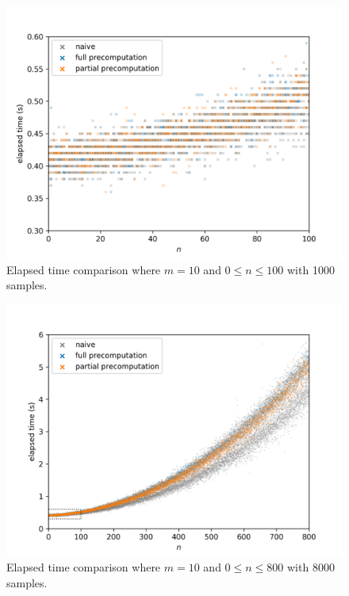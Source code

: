 \newpage

\begin{figure}[H]
	\centering
	\includegraphics[scale=0.7]{figures/precomputation_cpu_small}
	\caption{Elapsed time comparison where $m=10$ and $0\leq n\leq 100$ with 1000 samples.}
\end{figure}

\begin{figure}[H]
	\centering
	\includegraphics[scale=0.7]{figures/precomputation_cpu_big}
	\caption{Elapsed time comparison where $m=10$ and $0\leq n\leq 800$ with 8000 samples.}
\end{figure}

